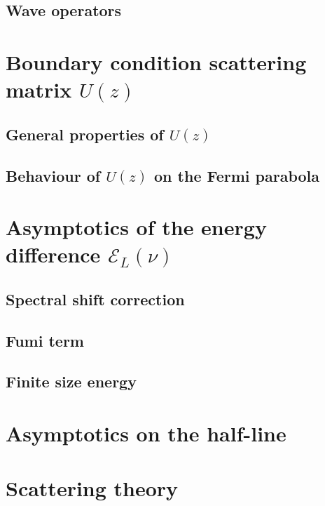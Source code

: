 \documentclass[10pt,a4paper,abstracton,toc=bibliography,DIV=12]{scrartcl} %
\numberwithin{equation}{section}
\begin{document}
\subsection{Wave operators\label{wo}}

%
\section{Boundary condition scattering matrix \texorpdfstring{$U(z)$}{U}\label{bcs}}

\subsection{General properties of \texorpdfstring{$U(z)$}{U}}

 
\subsection{Behaviour of \texorpdfstring{$U(z)$}{U} on the Fermi parabola}

%
\section{Asymptotics of the energy difference \texorpdfstring{$\mathcal{E}_L(\nu)$}{}\label{asymptotics}}

%
\subsection{Spectral shift correction\label{ssc}}

%
\subsection{Fumi term\label{fumi}}

%
\subsection{Finite size energy\label{fse}}

%
\section{Asymptotics on the half-line\label{hl}}

%
\appendix
%
\section{Scattering theory\label{scattering}}

\end{document}
